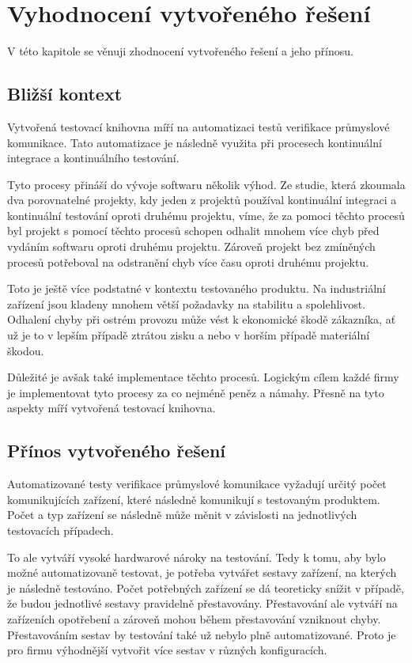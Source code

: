 \chapter{Vyhodnocení vytvořeného řešení}\label{chap:evaluation}

V této kapitole se věnuji zhodnocení vytvořeného řešení a jeho přínosu. \\


\section{Bližší kontext}
Vytvořená testovací knihovna míří na automatizaci testů verifikace průmyslové komunikace. Tato automatizace je následně využita při procesech kontinuální integrace a kontinuálního testování. 

Tyto procesy přináší do vývoje softwaru několik výhod. Ze studie, která zkoumala dva porovnatelné projekty, kdy jeden z projektů používal kontinuální integraci a kontinuální testování oproti druhému projektu, víme, že za pomoci těchto procesů byl projekt s pomocí těchto procesů schopen odhalit mnohem více chyb před vydáním softwaru oproti druhému projektu. Zároveň projekt bez zmíněných procesů potřeboval na odstranění chyb více času oproti druhému projektu. \cite{ci_study}

Toto je ještě více podstatné v kontextu testovaného produktu. Na industriální zařízení jsou kladeny mnohem větší požadavky na stabilitu a spolehlivost. Odhalení chyby při ostrém provozu může vést k ekonomické škodě zákazníka, ať už je to v lepším případě ztrátou zisku a nebo v horším případě materiální škodou.

Důležité je avšak také implementace těchto procesů. Logickým cílem každé firmy je implementovat tyto procesy za co nejméně peněz a námahy. Přesně na tyto aspekty míří vytvořená testovací knihovna. 


\section{Přínos vytvořeného řešení}

Automatizované testy verifikace průmyslové komunikace vyžadují určitý počet komunikujících zařízení, které následně komunikují s testovaným produktem. Počet a typ zařízení se následně může měnit v závislosti na jednotlivých testovacích případech.  

To ale vytváří vysoké hardwarové nároky na testování. Tedy k tomu, aby bylo možné automatizovaně testovat, je potřeba vytvářet sestavy zařízení, na kterých je následně testováno. Počet potřebných zařízení se dá teoreticky snížit v případě, že budou jednotlivé sestavy pravidelně přestavovány. Přestavování ale vytváří na zařízeních opotřebení a zároveň mohou během přestavování vzniknout chyby. Přestavováním sestav by testování také už nebylo plně automatizované. Proto je pro firmu výhodnější vytvořit více sestav v různých konfiguracích.

